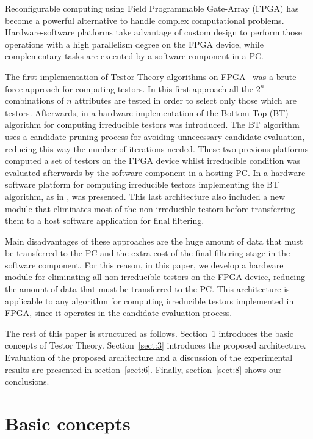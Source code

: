 \documentclass[conference]{IEEEtran}
\begin{document}
Reconfigurable computing using Field Programmable Gate-Array (FPGA) has become a powerful alternative to handle 
complex computational problems. 
Hardware-software platforms take advantage of custom design to perform those operations with a high
parallelism degree on the FPGA device, while complementary tasks are executed by a software component in a PC.

The first implementation of Testor Theory algorithms on FPGA~\cite{Cumplido06} was a brute force approach for 
computing testors. In this first approach all the $2^n$ combinations of $n$ attributes are tested in order to 
select only those which are testors. Afterwards, in \cite{Rojas07} a hardware implementation of the Bottom-Top 
(BT) algorithm for computing irreducible testors was introduced. 
The BT algorithm uses a candidate pruning process for avoiding unnecessary candidate evaluation, 
reducing this way the number of iterations needed. These two previous platforms computed a set of testors on the 
FPGA device whilst irreducible condition was evaluated afterwards by the software component in a hosting PC. 
In \cite{Rojas12} a hardware-software platform for computing irreducible testors implementing the BT algorithm, 
as in \cite{Rojas07}, was presented. This last architecture also included a new module that eliminates most of 
the non irreducible testors before transferring them to a host software application for final filtering. 

Main disadvantages of these approaches are the huge amount of data that must be transferred to the PC and the 
extra cost of the final filtering stage in the software component.  
For this reason, in this paper, we develop a hardware module for eliminating all non irreducible testors 
on the FPGA device, reducing the amount of data that must be transferred to the PC. This architecture is 
applicable to any algorithm for computing irreducible testors implemented in FPGA, since it operates in the 
candidate evaluation process.

The rest of this paper is structured as follows. Section~\ref{sect:2} introduces the basic concepts of 
Testor Theory. Section~\ref{sect:3} introduces the proposed architecture. Evaluation of the proposed 
architecture and a discussion of the experimental results are presented in section~\ref{sect:6}. Finally,
section~\ref{sect:8} shows our conclusions.

\section{Basic concepts}
\label{sect:2}
\end{document}
